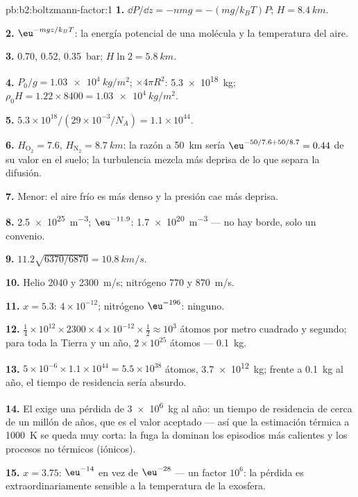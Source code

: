 \begin{solution}{pb:b2:boltzmann-factor:1}
\textbf{1.} $\dd P/\dd z = -nmg = -(mg/k_BT)P$; $H = \qty{8.4}{km}$.

\textbf{2.} $\eu^{-mgz/k_BT}$: la energía potencial de una molécula y la
temperatura del aire.

\textbf{3.} \qty{0.70}{}, \qty{0.52}{}, \qty{0.35}{bar}; $H\ln 2 = \qty{5.8}{km}$.

\textbf{4.} $P_0/g = \qty{1.03e4}{kg/m^2}$; $\times 4\pi R^2$: \qty{5.3e18}{kg}; $\rho_0H =
1.22 \times 8400 = \qty{1.03e4}{kg/m^2}$.

\textbf{5.} $5.3 \times 10^{18}/(29 \times 10^{-3}/N_A) = 1.1 \times 10^{44}$.

\textbf{6.} $H_{\text{O}_2} = 7.6$, $H_{\text{N}_2} = \qty{8.7}{km}$: la razón a \qty{50}{km}
sería $\eu^{-50/7.6 + 50/8.7} = 0.44$ de su valor en el suelo; la turbulencia mezcla
más deprisa de lo que separa la difusión.

\textbf{7.} Menor: el aire frío es más denso y la presión cae más deprisa.

\textbf{8.} \qty{2.5e25}{m^{-3}}; $\eu^{-11.9}$: \qty{1.7e20}{m^{-3}} --- no hay borde, solo un
convenio.

\textbf{9.} $11.2\sqrt{6370/6870} = \qty{10.8}{km/s}$.

\textbf{10.} Helio \qty{2040}{} y \qty{2300}{m/s}; nitrógeno \qty{770}{} y \qty{870}{m/s}.

\textbf{11.} $x = 5.3$: $4 \times 10^{-12}$; nitrógeno $\eu^{-196}$: ninguno.

\textbf{12.} $\tfrac14 \times 10^{12} \times 2300 \times 4 \times 10^{-12} \times \tfrac12 \approx
10^3$ átomos por metro cuadrado y segundo; para toda la Tierra y un año,
$2 \times 10^{25}$ átomos --- \qty{0.1}{kg}.

\textbf{13.} $5 \times 10^{-6} \times 1.1 \times 10^{44} = 5.5 \times 10^{38}$ átomos, \qty{3.7e12}{kg};
frente a \qty{0.1}{kg} al año, el tiempo de residencia sería absurdo.

\textbf{14.} El  exige una pérdida de \qty{3e6}{kg} al año: un tiempo
de residencia de cerca de un millón de años, que es el valor aceptado --- así que
la estimación térmica a \qty{1000}{K} se queda muy corta: la fuga la
dominan los episodios más calientes y los procesos no térmicos (iónicos).

\textbf{15.} $x = 3.75$: $\eu^{-14}$ en vez de $\eu^{-28}$ --- un factor $10^6$:
la pérdida es extraordinariamente sensible a la temperatura de la exosfera.


\end{solution}
